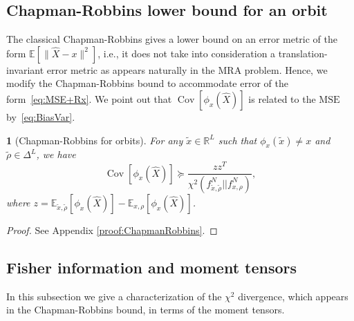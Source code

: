 \documentclass{IEEEtran}
\numberwithin{equation}{section}
\numberwithin{figure}{section}
\theoremstyle{plain}
\newtheorem{thm}{\protect\theoremname}[section]
\theoremstyle{definition}
\theoremstyle{remark}
\theoremstyle{plain}
\theoremstyle{remark}
\theoremstyle{plain}
\theoremstyle{plain}
\theoremstyle{remark}
\providecommand{\theoremname}{Theorem}
\newcommand{\RL}{\mathbb{R}^L}
\newcommand{\E}{\mathbb{E}}
\DeclareMathOperator*{\Cov}{Cov}
\newcommand{\MSE}{\mathrm{MSE}}
\begin{document}

\subsection{Chapman-Robbins lower bound for an orbit}\label{sec:ChapmanRobbins}
The classical Chapman-Robbins gives a lower bound on an error metric of the form $\E[\|\widehat X -x\|^2]$, i.e., it does not take into consideration a translation-invariant error metric as appears naturally in the MRA problem. 
Hence, we modify the Chapman-Robbins bound to accommodate error of the form~\eqref{eq:MSE+Rx}. 
We point out that $\Cov[\phi_x(\widehat X)]$ is related to the $\MSE$ by~\eqref{eq:BiasVar}.
\begin{thm}[Chapman-Robbins for orbits]\label{thm:ChapmanRobbins}
	For any $\tilde x\in\RL$ such that $\phi_x(\tilde x)\neq x$ and $\tilde \rho\in \Delta^L$, we have
	\begin{equation*}
	\Cov[\phi_x(\widehat X)]\succeq \frac{z z^T}
	{\chi^2(f^N_{\tilde x,\tilde \rho}||f^N_{x,\rho})},
	\end{equation*}
	where $z=\E_{\tilde x,\tilde \rho}[\phi_{x}(\widehat X)]-\E_{x,\rho}[\phi_{x}(\widehat X)]$. 
\end{thm}
\begin{proof}
	See Appendix \ref{proof:ChapmanRobbins}.
\end{proof}

\subsection{Fisher information and moment tensors}
\label{sec:Fisherautocorr}
In this subsection we give a characterization of the $\chi^2$ divergence, which appears in the Chapman-Robbins bound, in terms of the moment tensors. 
\end{document}
